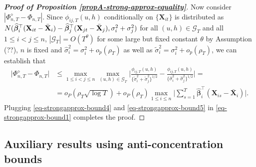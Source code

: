 \documentclass[a4paper,12pt]{article}
\begin{document}
\begin{proof}[\textnormal{\textbf{Proof of Proposition \ref{propA-strong-approx-equality}}}]
Now consider $|\Phi_{n, T}^{\diamond} - \Phi_{n, T}|$. Since $\phi_{ij, T}(u,h)$ conditionally on $\{\mathbf{X}_{it}\}$ is distributed as $ N(\widehat{\bm{\beta}}_i^\top (\mathbf{X}_{it} - \bar{\mathbf{X}}_{i}) -  \widehat{\bm{\beta}}_j^\top (\mathbf{X}_{jt} - \bar{\mathbf{X}}_{j}),\sigma^2_i + \sigma^2_j)$ for all $(u,h) \in \mathcal{G}_T$ and all $1\le i < j \le n$, $|\mathcal{G}_T| = O(T^\theta)$ for some large but fixed constant $\theta$ by Assumption (??), $n$ is fixed and $\widehat{\sigma}^2_i = \sigma^2_i + o_p(\rho_T)$ as well as $\widetilde{\sigma}^2_i = \sigma^2_i + o_p(\rho_T)$, we can establish that
\begin{align}\label{eq-strongapprox-bound5}
\big| \Phi_{n, T}^{\diamond} - \Phi_{n, T} \big| &\le \max_{1\leq i< j \leq n}\max_{(u,h) \in \mathcal{G}_T} \Big|\frac{\phi_{ij, T}(u,h)}{\{\widetilde{\sigma}_i^2 + \widetilde{\sigma}_j^2 \}^{1/2}} - \frac{\phi_{ij, T}(u,h)}{\{\widehat{\sigma}_i^2 + \widehat{\sigma}_j^2 \}^{1/2}}\Big| = \nonumber\\
&=o_P(\rho_T \sqrt{\log T}) + o_P(\rho_T)\max_{1\le i\le n} \Big|\sum\limits_{s=1}^T \widehat{\bm{\beta}}_i^\top(\mathbf{X}_{is} - \bar{\mathbf{X}}_{i} )\Big|.
\end{align}
Plugging \eqref{eq-strongapprox-bound4} and \eqref{eq-strongapprox-bound5} in \eqref{eq-strongapprox-bound1} completes the proof.
\end{proof}



\subsection*{Auxiliary results using anti-concentration bounds}
\end{document}
